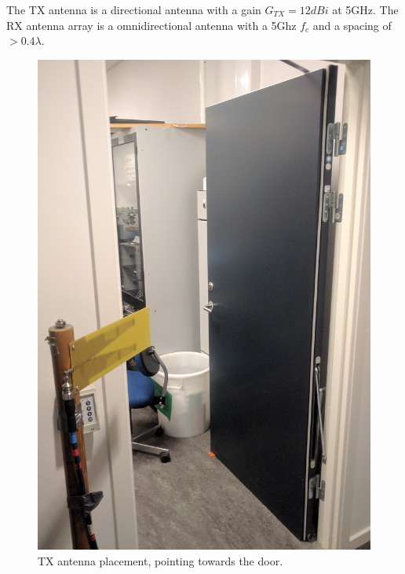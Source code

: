 The TX antenna is a directional antenna with a gain $G_{TX}=12dBi$ at 5GHz.
The RX antenna array is a omnidirectional antenna with a 5Ghz $f_c$ and a spacing of $>0.4 \lambda$.

\begin{figure}[H]
  \centering
  \begin{minipage}[H]{0.42\textwidth}
    \includegraphics[width=\textwidth]{pictures/Measurement/antenna_door.jpg}
    \caption{TX antenna placement, pointing towards the door.}
    \label{antennadoor}
  \end{minipage}
  \hfill
  \begin{minipage}[H]{0.4\textwidth}

\end{minipage}
\end{figure}
